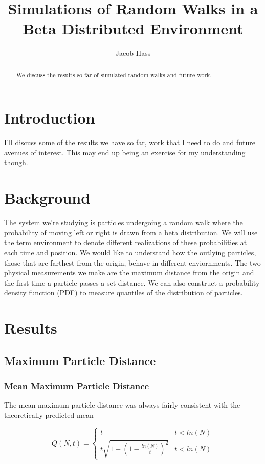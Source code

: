 \documentclass{article}
\title{Simulations of Random Walks in a Beta Distributed Environment}
\author{Jacob Hass}
\begin{document}
\maketitle

\begin{abstract}
We discuss the results so far of simulated random walks and future work.
\end{abstract}

\section{Introduction}
\indent\indent I'll discuss some of the results we have so far, work that I need to do and future avenues of interest. This may end up being an exercise for my understanding though.

\section{Background}
\indent\indent The system we're studying is particles undergoing a random walk where the probability of moving left or right is drawn from a beta distribution. We will use the term environment to denote different realizations of these probabilities at each time and position. We would like to understand how the outlying particles, those that are farthest from the origin, behave in different enviornments. The two physical measurements we make are the maximum distance from the origin and the first time a particle passes a set distance. We can also construct a probability density function (PDF) to measure quantiles of the distribution of particles.

\section{Results}
\subsection{Maximum Particle Distance}
\subsubsection{Mean Maximum Particle Distance}
 \indent\indent The mean maximum particle distance was always fairly consistent with the theoretically predicted mean

 \begin{equation}
 \bar{Q}(N, t) = \begin{cases} t & t < ln(N) \\  t\sqrt{1 - (1-\frac{ln(N)}{t})^{2}} & t< ln(N) \end{cases}
 \end{equation}
\end{document}
